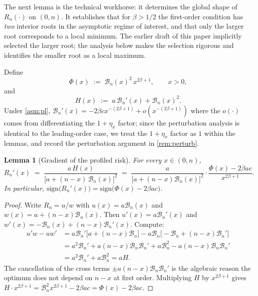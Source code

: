 \documentclass[11pt]{article}
\theoremstyle{plain}
\newtheorem{lemma}[theorem]{Lemma}
\theoremstyle{definition}
\theoremstyle{remark}
\begin{document}
The next lemma is the technical workhorse: it determines the global shape of $R_n(\cdot)$ on $(0,n)$. It establishes that for $\beta>1/2$ the first-order condition has \emph{two} interior roots in the asymptotic regime of interest, and that only the larger root corresponds to a local minimum. The earlier draft of this paper implicitly selected the larger root; the analysis below makes the selection rigorous and identifies the smaller root as a local maximum.

Define
\begin{equation}\label{eq:Phi-def}
\Phi(x)\;:=\;\mathcal{B}_n(x)^2\,x^{2\beta+1},\qquad x>0,
\end{equation}
and
\begin{equation}\label{eq:H-def}
H(x)\;:=\;a\,\mathcal{B}_n'(x)+\mathcal{B}_n(x)^2.
\end{equation}
Under \cref{asm:pl}, $\mathcal{B}_n'(x)=-2\beta cx^{-(2\beta+1)}+o(x^{-(2\beta+1)})$ where the $o(\cdot)$ comes from differentiating the $1+\eta_x$ factor; since the perturbation analysis is identical to the leading-order case, we treat the $1+\eta_x$ factor as $1$ within the lemmas, and record the perturbation argument in \cref{rem:perturb}.

\begin{lemma}[Gradient of the profiled risk]\label{lem:gradient}
For every $x\in(0,n)$,
\begin{equation}\label{eq:Rn-prime}
R_n'(x)\;=\;\frac{a\,H(x)}{\bigl[a+(n-x)\,\mathcal{B}_n(x)\bigr]^2}\;=\;\frac{a}{\bigl[a+(n-x)\mathcal{B}_n(x)\bigr]^2}\cdot\frac{\Phi(x)-2\beta a c}{x^{2\beta+1}}.
\end{equation}
In particular, $\mathrm{sign}\bigl(R_n'(x)\bigr)=\mathrm{sign}\bigl(\Phi(x)-2\beta ac\bigr)$.
\end{lemma}

\begin{proof}
Write $R_n=u/w$ with $u(x)=a\mathcal{B}_n(x)$ and $w(x)=a+(n-x)\mathcal{B}_n(x)$. Then $u'(x)=a\mathcal{B}_n'(x)$ and $w'(x)=-\mathcal{B}_n(x)+(n-x)\mathcal{B}_n'(x)$. Compute:
\begin{align*}
u'w-uw'&=a\mathcal{B}_n'\bigl[a+(n-x)\mathcal{B}_n\bigr]-a\mathcal{B}_n\bigl[-\mathcal{B}_n+(n-x)\mathcal{B}_n'\bigr]\\
&=a^2\mathcal{B}_n'+a(n-x)\mathcal{B}_n\mathcal{B}_n'+a\mathcal{B}_n^2-a(n-x)\mathcal{B}_n\mathcal{B}_n'\\
&=a^2\mathcal{B}_n'+a\mathcal{B}_n^2=aH.
\end{align*}
The cancellation of the cross terms $\pm a(n-x)\mathcal{B}_n\mathcal{B}_n'$ is the algebraic reason the optimum does not depend on $n-x$ at first order. Multiplying $H$ by $x^{2\beta+1}$ gives $H\cdot x^{2\beta+1}=\mathcal{B}_n^2 x^{2\beta+1}-2\beta ac=\Phi(x)-2\beta ac$.
\end{proof}
\end{document}
